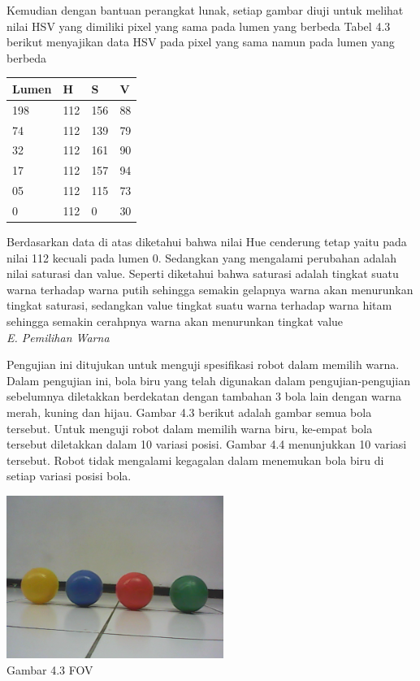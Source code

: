 \documentclass[10pt,journal,compsoc]{IEEEtran}
\begin{document}
    Kemudian dengan bantuan perangkat lunak, setiap gambar diuji untuk melihat nilai HSV yang dimiliki pixel yang sama pada lumen yang berbeda
  Tabel 4.3 berikut menyajikan data HSV pada pixel yang sama namun pada lumen yang berbeda
  
   \begin{center}
   \begin{tabular}{ |l|l|l|l| }
    \hline
    Lumen & H & S & V\\
   \hline
    198 & 112  & 156  & 88 \\
    74  & 112  & 139  & 79 \\
    32  & 112  & 161  & 90 \\
    17  & 112  & 157  & 94 \\
    05  & 112  & 115  & 73 \\
    0   & 112  & 0    & 30 \\
    \hline
   \end{tabular}
   \end{center}
   
   Berdasarkan data di atas diketahui bahwa nilai Hue cenderung tetap yaitu pada nilai 112 kecuali pada lumen 0.
   Sedangkan yang mengalami perubahan adalah nilai saturasi dan value. 
   Seperti diketahui bahwa saturasi adalah tingkat suatu warna terhadap warna putih sehingga semakin gelapnya warna akan menurunkan tingkat saturasi, sedangkan value tingkat suatu warna terhadap warna hitam sehingga semakin cerahpnya warna akan menurunkan tingkat value\\

  \noindent \textit{E. Pemilihan Warna}
  
  Pengujian ini ditujukan untuk menguji spesifikasi robot dalam memilih warna. 
  Dalam pengujian ini, bola biru yang telah digunakan dalam pengujian-pengujian sebelumnya diletakkan berdekatan dengan tambahan 3 bola lain dengan warna merah, kuning dan hijau. 
  Gambar 4.3 berikut adalah gambar semua bola tersebut. 
  Untuk menguji robot dalam memilih warna biru, ke-empat bola tersebut diletakkan dalam 10 variasi posisi. 
  Gambar 4.4 menunjukkan 10 variasi tersebut. Robot tidak mengalami kegagalan dalam menemukan bola biru di setiap variasi posisi bola.

  \begin{center}
    \includegraphics[width=200pt]{ball_all}\\
    Gambar 4.3 FOV
  \end{center}
  
\end{document}
